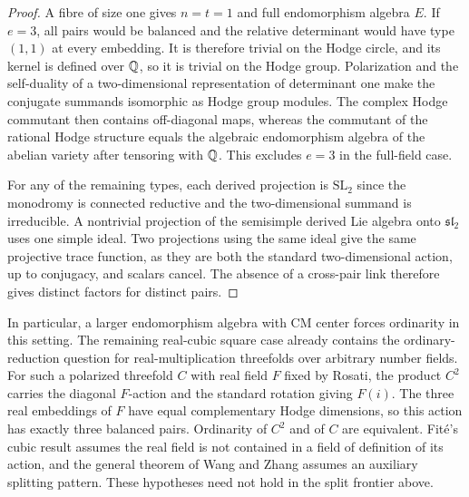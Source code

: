 \begin{proof}
A fibre of size one gives \(n=t=1\) and full endomorphism
algebra \(E\). If \(e=3\), all pairs would be balanced and the
relative determinant would have type \((1,1)\) at every embedding.
It is therefore trivial on the Hodge circle, and its kernel is
defined over \(\mathbb Q\), so it is trivial on the Hodge group.
Polarization and the self-duality of a two-dimensional representation
of determinant one make the conjugate summands isomorphic as Hodge
group modules. The complex Hodge commutant then contains
off-diagonal maps, whereas the commutant of the rational Hodge
structure equals the algebraic endomorphism algebra of the
abelian variety after tensoring with \(\mathbb Q\). This excludes \(e=3\)
in the full-field case.

For any of the remaining types, each derived projection is
\(\mathrm{SL}_2\) since the monodromy is connected reductive and
the two-dimensional summand is irreducible. A nontrivial
projection of the semisimple derived Lie algebra onto
\(\mathfrak{sl}_2\) uses one simple ideal. Two projections
using the same ideal give the same projective trace function,
as they are both the standard two-dimensional action, up to
conjugacy, and scalars cancel. The absence of a cross-pair link
therefore gives distinct factors for distinct pairs.
\end{proof}

In particular, a larger endomorphism algebra with CM center
forces ordinarity in this setting. The remaining real-cubic
square case already contains the ordinary-reduction question for
real-multiplication threefolds over arbitrary number fields.
For such a polarized threefold \(C\) with real field \(F\) fixed
by Rosati, the product \(C^2\) carries the diagonal \(F\)-action
and the standard rotation giving \(F(i)\). The three real
embeddings of \(F\) have equal complementary Hodge dimensions,
so this action has exactly three balanced pairs. Ordinarity of
\(C^2\) and of \(C\) are equivalent. Fité's cubic result
\cite[Theorem~3]{fite} assumes the real field is not contained
in a field of definition of its action, and the general theorem of
Wang and Zhang \cite[Theorem~1.3]{wangzhang} assumes an
auxiliary splitting pattern. These hypotheses need not hold
in the split frontier above.
